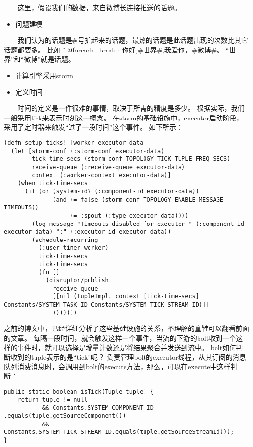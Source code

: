   这里，假设我们的数据，来自微博长连接推送的话题。

\begin{itemize}
\item
  问题建模
\end{itemize}

  我们认为的话题是\#号扩起来的话题，最热的话题是此话题出现的次数比其它话题都要多。
比如：@foreach\_break : 你好,\#世界\#,我爱你，\#微博\#。
``世界''和``微博''就是话题。

\begin{itemize}
\item
  计算引擎采用storm
\item
  定义时间
\end{itemize}

  时间的定义是一件很难的事情，取决于所需的精度是多少。
根据实际，我们一般采用tick来表示时刻这一概念。
在storm的基础设施中，executor启动阶段，采用了定时器来触发``过了一段时间''这个事件。
如下所示：

\begin{verbatim}
(defn setup-ticks! [worker executor-data]
  (let [storm-conf (:storm-conf executor-data)
        tick-time-secs (storm-conf TOPOLOGY-TICK-TUPLE-FREQ-SECS)
        receive-queue (:receive-queue executor-data)
        context (:worker-context executor-data)]
    (when tick-time-secs
      (if (or (system-id? (:component-id executor-data))
              (and (= false (storm-conf TOPOLOGY-ENABLE-MESSAGE-TIMEOUTS))
                   (= :spout (:type executor-data))))
        (log-message "Timeouts disabled for executor " (:component-id executor-data) ":" (:executor-id executor-data))
        (schedule-recurring
          (:user-timer worker)
          tick-time-secs
          tick-time-secs
          (fn []
            (disruptor/publish
              receive-queue
              [[nil (TupleImpl. context [tick-time-secs] Constants/SYSTEM_TASK_ID Constants/SYSTEM_TICK_STREAM_ID)]]
              )))))))
\end{verbatim}

之前的博文中，已经详细分析了这些基础设施的关系，不理解的童鞋可以翻看前面的文章。
每隔一段时间，就会触发这样一个事件，当流的下游的bolt收到一个这样的事件时，就可以选择是增量计数还是将结果聚合并发送到流中。
bolt如何判断收到的tuple表示的是``tick''呢？
负责管理bolt的executor线程，从其订阅的消息队列消费消息时，会调用到bolt的execute方法，那么，可以在execute中这样判断：

\begin{verbatim}
public static boolean isTick(Tuple tuple) {
    return tuple != null
           && Constants.SYSTEM_COMPONENT_ID  .equals(tuple.getSourceComponent())
           && Constants.SYSTEM_TICK_STREAM_ID.equals(tuple.getSourceStreamId());
}
\end{verbatim}


